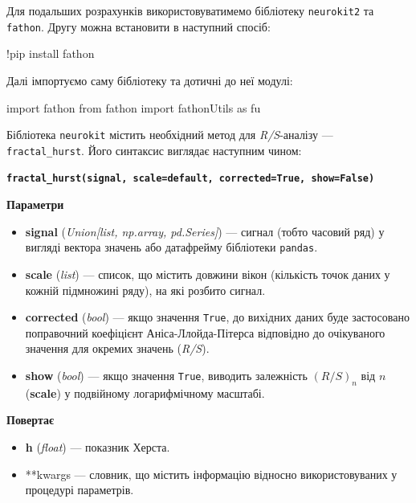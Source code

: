 \documentclass[
  letterpaper,
]{report}
\newenvironment{Shaded}{\begin{snugshade}}{\end{snugshade}}
\newcommand{\ImportTok}[1]{\textcolor[rgb]{0.00,0.46,0.62}{#1}}
\newcommand{\NormalTok}[1]{\textcolor[rgb]{0.00,0.23,0.31}{#1}}
\newcommand{\OperatorTok}[1]{\textcolor[rgb]{0.37,0.37,0.37}{#1}}
\providecommand{\tightlist}{%
  \setlength{\itemsep}{0pt}\setlength{\parskip}{0pt}}\usepackage{longtable,booktabs,array}
\begin{document}
Для подальших розрахунків використовуватимемо бібліотеку
\texttt{neurokit2} та \texttt{fathon}. Другу можна встановити в
наступний спосіб:

\begin{Shaded}
\begin{Highlighting}[]
\OperatorTok{!}\NormalTok{pip install fathon}
\end{Highlighting}
\end{Shaded}

Далі імпортуємо саму бібліотеку та дотичні до неї модулі:

\begin{Shaded}
\begin{Highlighting}[]
\ImportTok{import}\NormalTok{ fathon}
\ImportTok{from}\NormalTok{ fathon }\ImportTok{import}\NormalTok{ fathonUtils }\ImportTok{as}\NormalTok{ fu}
\end{Highlighting}
\end{Shaded}

Бібліотека \texttt{neurokit} містить необхідний метод для
\emph{R/S}-аналізу --- \texttt{fractal\_hurst}. Його синтаксис виглядає
наступним чином:

\textbf{\texttt{fractal\_hurst(signal,\ scale=\textquotesingle{}default\textquotesingle{},\ corrected=True,\ show=False)}}

\textbf{Параметри}

\begin{itemize}
\tightlist
\item
  \textbf{signal} (\emph{Union{[}list, np.array, pd.Series{]}}) ---
  сигнал (тобто часовий ряд) у вигляді вектора значень або датафрейму
  бібліотеки \texttt{pandas}.
\item
  \textbf{scale} (\emph{list}) --- список, що містить довжини вікон
  (кількість точок даних у кожній підмножині ряду), на які розбито
  сигнал.
\item
  \textbf{corrected} (\emph{bool}) --- якщо значення \texttt{True}, до
  вихідних даних буде застосовано поправочний коефіцієнт
  Аніса-Ллойда-Пітерса відповідно до очікуваного значення для окремих
  значень (\emph{R/S}).
\item
  \textbf{show} (\emph{bool}) --- якщо значення \texttt{True}, виводить
  залежність \((R/S)_n\) від \(n\) (\textbf{scale}) у подвійному
  логарифмічному масштабі.
\end{itemize}

\textbf{Повертає}

\begin{itemize}
\tightlist
\item
  \textbf{h} (\emph{float}) --- показник Херста.
\item
  **kwargs --- словник, що містить інформацію відносно використовуваних
  у процедурі параметрів.
\end{itemize}
\end{document}
